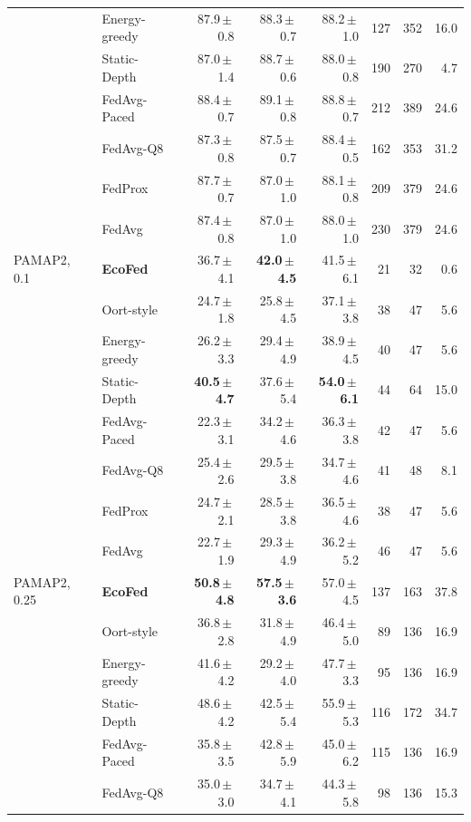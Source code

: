 \begin{tabular}{@{}llrrrrrr@{}}
 & Energy-greedy & 87.9\,$\pm$\,0.8 & 88.3\,$\pm$\,0.7 & 88.2\,$\pm$\,1.0 & 127 & 352 & 16.0\\
 & Static-Depth & 87.0\,$\pm$\,1.4 & 88.7\,$\pm$\,0.6 & 88.0\,$\pm$\,0.8 & 190 & 270 & 4.7\\
 & FedAvg-Paced & 88.4\,$\pm$\,0.7 & 89.1\,$\pm$\,0.8 & 88.8\,$\pm$\,0.7 & 212 & 389 & 24.6\\
 & FedAvg-Q8 & 87.3\,$\pm$\,0.8 & 87.5\,$\pm$\,0.7 & 88.4\,$\pm$\,0.5 & 162 & 353 & 31.2\\
 & FedProx & 87.7\,$\pm$\,0.7 & 87.0\,$\pm$\,1.0 & 88.1\,$\pm$\,0.8 & 209 & 379 & 24.6\\
 & FedAvg & 87.4\,$\pm$\,0.8 & 87.0\,$\pm$\,1.0 & 88.0\,$\pm$\,1.0 & 230 & 379 & 24.6\\
\midrule
PAMAP2, 0.1 & \textbf{EcoFed} & 36.7\,$\pm$\,4.1 & \textbf{42.0\,$\pm$\,4.5} & 41.5\,$\pm$\,6.1 & 21 & 32 & 0.6\\
 & Oort-style & 24.7\,$\pm$\,1.8 & 25.8\,$\pm$\,4.5 & 37.1\,$\pm$\,3.8 & 38 & 47 & 5.6\\
 & Energy-greedy & 26.2\,$\pm$\,3.3 & 29.4\,$\pm$\,4.9 & 38.9\,$\pm$\,4.5 & 40 & 47 & 5.6\\
 & Static-Depth & \textbf{40.5\,$\pm$\,4.7} & 37.6\,$\pm$\,5.4 & \textbf{54.0\,$\pm$\,6.1} & 44 & 64 & 15.0\\
 & FedAvg-Paced & 22.3\,$\pm$\,3.1 & 34.2\,$\pm$\,4.6 & 36.3\,$\pm$\,3.8 & 42 & 47 & 5.6\\
 & FedAvg-Q8 & 25.4\,$\pm$\,2.6 & 29.5\,$\pm$\,3.8 & 34.7\,$\pm$\,4.6 & 41 & 48 & 8.1\\
 & FedProx & 24.7\,$\pm$\,2.1 & 28.5\,$\pm$\,3.8 & 36.5\,$\pm$\,4.6 & 38 & 47 & 5.6\\
 & FedAvg & 22.7\,$\pm$\,1.9 & 29.3\,$\pm$\,4.9 & 36.2\,$\pm$\,5.2 & 46 & 47 & 5.6\\
\midrule
PAMAP2, 0.25 & \textbf{EcoFed} & \textbf{50.8\,$\pm$\,4.8} & \textbf{57.5\,$\pm$\,3.6} & 57.0\,$\pm$\,4.5 & 137 & 163 & 37.8\\
 & Oort-style & 36.8\,$\pm$\,2.8 & 31.8\,$\pm$\,4.9 & 46.4\,$\pm$\,5.0 & 89 & 136 & 16.9\\
 & Energy-greedy & 41.6\,$\pm$\,4.2 & 29.2\,$\pm$\,4.0 & 47.7\,$\pm$\,3.3 & 95 & 136 & 16.9\\
 & Static-Depth & 48.6\,$\pm$\,4.2 & 42.5\,$\pm$\,5.4 & 55.9\,$\pm$\,5.3 & 116 & 172 & 34.7\\
 & FedAvg-Paced & 35.8\,$\pm$\,3.5 & 42.8\,$\pm$\,5.9 & 45.0\,$\pm$\,6.2 & 115 & 136 & 16.9\\
 & FedAvg-Q8 & 35.0\,$\pm$\,3.0 & 34.7\,$\pm$\,4.1 & 44.3\,$\pm$\,5.8 & 98 & 136 & 15.3\\

\end{tabular}
